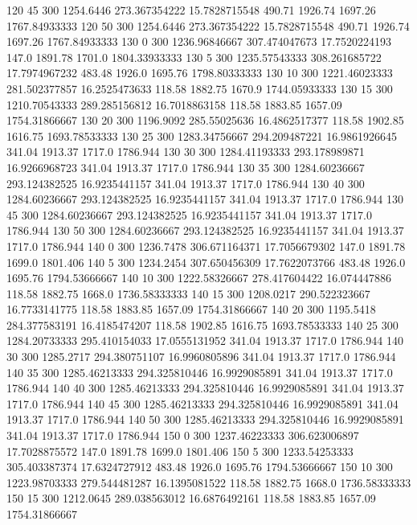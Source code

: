 120  45  300  1254.6446  273.367354222  15.7828715548  490.71  1926.74  1697.26  1767.84933333 
120  50  300  1254.6446  273.367354222  15.7828715548  490.71  1926.74  1697.26  1767.84933333 
130  0  300  1236.96846667  307.474047673  17.7520224193  147.0  1891.78  1701.0  1804.33933333 
130  5  300  1235.57543333  308.261685722  17.7974967232  483.48  1926.0  1695.76  1798.80333333 
130  10  300  1221.46023333  281.502377857  16.2525473633  118.58  1882.75  1670.9  1744.05933333 
130  15  300  1210.70543333  289.285156812  16.7018863158  118.58  1883.85  1657.09  1754.31866667 
130  20  300  1196.9092  285.55025636  16.4862517377  118.58  1902.85  1616.75  1693.78533333 
130  25  300  1283.34756667  294.209487221  16.9861926645  341.04  1913.37  1717.0  1786.944 
130  30  300  1284.41193333  293.178989871  16.9266968723  341.04  1913.37  1717.0  1786.944 
130  35  300  1284.60236667  293.124382525  16.9235441157  341.04  1913.37  1717.0  1786.944 
130  40  300  1284.60236667  293.124382525  16.9235441157  341.04  1913.37  1717.0  1786.944 
130  45  300  1284.60236667  293.124382525  16.9235441157  341.04  1913.37  1717.0  1786.944 
130  50  300  1284.60236667  293.124382525  16.9235441157  341.04  1913.37  1717.0  1786.944 
140  0  300  1236.7478  306.671164371  17.7056679302  147.0  1891.78  1699.0  1801.406 
140  5  300  1234.2454  307.650456309  17.7622073766  483.48  1926.0  1695.76  1794.53666667 
140  10  300  1222.58326667  278.417604422  16.074447886  118.58  1882.75  1668.0  1736.58333333 
140  15  300  1208.0217  290.522323667  16.7733141775  118.58  1883.85  1657.09  1754.31866667 
140  20  300  1195.5418  284.377583191  16.4185474207  118.58  1902.85  1616.75  1693.78533333 
140  25  300  1284.20733333  295.410154033  17.0555131952  341.04  1913.37  1717.0  1786.944 
140  30  300  1285.2717  294.380751107  16.9960805896  341.04  1913.37  1717.0  1786.944 
140  35  300  1285.46213333  294.325810446  16.9929085891  341.04  1913.37  1717.0  1786.944 
140  40  300  1285.46213333  294.325810446  16.9929085891  341.04  1913.37  1717.0  1786.944 
140  45  300  1285.46213333  294.325810446  16.9929085891  341.04  1913.37  1717.0  1786.944 
140  50  300  1285.46213333  294.325810446  16.9929085891  341.04  1913.37  1717.0  1786.944 
150  0  300  1237.46223333  306.623006897  17.7028875572  147.0  1891.78  1699.0  1801.406 
150  5  300  1233.54253333  305.403387374  17.6324727912  483.48  1926.0  1695.76  1794.53666667 
150  10  300  1223.98703333  279.544481287  16.1395081522  118.58  1882.75  1668.0  1736.58333333 
150  15  300  1212.0645  289.038563012  16.6876492161  118.58  1883.85  1657.09  1754.31866667 
